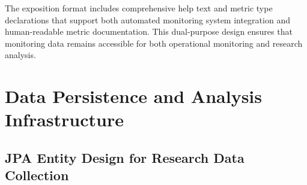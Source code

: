 

The exposition format includes comprehensive help text and metric type declarations that support both automated monitoring system integration and human-readable metric documentation. This dual-purpose design ensures that monitoring data remains accessible for both operational monitoring and research analysis.


\section{Data Persistence and Analysis Infrastructure}

\subsection{JPA Entity Design for Research Data Collection}

